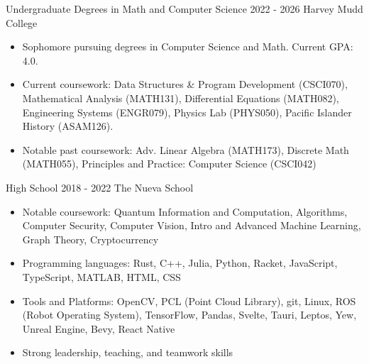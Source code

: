\documentclass[9pt]{resume}
\begin{document}
    \begin{experiencelist}
        \experience 
            {Undergraduate Degrees in Math and Computer Science}
            {2022 - 2026}
            {Harvey Mudd College}
            {\begin{itemize}[noitemsep, topsep=1pt]
                \item {Sophomore pursuing degrees in Computer Science and Math. Current GPA: 4.0. }
                \item {Current coursework: Data Structures \& Program Development (CSCI070), Mathematical Analysis (MATH131), Differential Equations (MATH082), Engineering Systems (ENGR079), Physics Lab (PHYS050), Pacific Islander History (ASAM126).}
                \item {Notable past coursework: Adv. Linear Algebra (MATH173), Discrete Math (MATH055), Principles and Practice: Computer Science (CSCI042)}
            \end{itemize}}
        \experience
            {High School}
            {2018 - 2022}
            {The Nueva School}
            {\begin{itemize}[noitemsep, topsep=1pt]
                \item Notable coursework: Quantum Information and Computation, Algorithms, Computer Security, Computer Vision, Intro and Advanced Machine Learning, Graph Theory, Cryptocurrency
            \end{itemize}}
    \end{experiencelist}
    \vspace{-0.4cm}
    \begin{itemize}[noitemsep, topsep=0pt]
        \item Programming languages: Rust, C++, Julia, Python, Racket, JavaScript, TypeScript, MATLAB, HTML, CSS
        \item Tools and Platforms: OpenCV, PCL (Point Cloud Library), git, Linux, ROS (Robot Operating System), TensorFlow, Pandas, Svelte, Tauri, Leptos, Yew, Unreal Engine, Bevy, React Native
        \item Strong leadership, teaching, and teamwork skills
    \end{itemize}
    \vspace{0.4cm}
        
\end{document}
